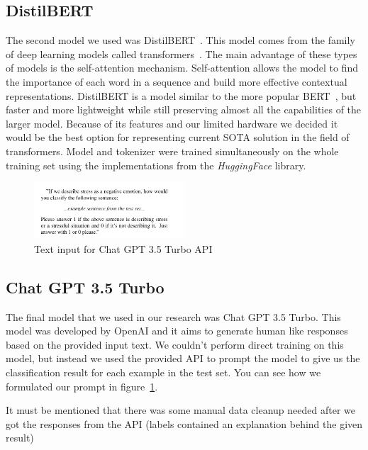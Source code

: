 \documentclass[10pt, a4paper]{article}
\begin{document}
\subsection{DistilBERT}
The second model we used was DistilBERT~\citep{sanh2020distilbert}.
This model comes from the family of deep learning models called transformers~\citep{vaswani2017attention}.
The main advantage of these types of models is the self-attention mechanism.
Self-attention allows the model to find the importance of each word in a sequence and build more effective contextual representations.
\hfill \break
\hfill \break
DistilBERT is a model similar to the more popular BERT~\citep{devlin2019bert}, but faster and more lightweight while still preserving almost all the capabilities of the larger model.
Because of its features and our limited hardware we decided it would be the best option for representing current SOTA solution in the field of transformers.
Model and tokenizer were trained simultaneously on the whole training set using the implementations from the \textit{HuggingFace} library.



\begin{figure}
    \centering
    \includegraphics[width=0.5\textwidth]{images/chat-gpt-prompt}
    \caption{Text input for Chat GPT 3.5 Turbo API}
    \label{fig:chat-gpt-prompt}
\end{figure}


\subsection{Chat GPT 3.5 Turbo}
The final model that we used in our research was Chat GPT 3.5 Turbo.
This model was developed by OpenAI and it aims to generate human like responses based on the provided input text.
We couldn't perform direct training on this model, but instead we used the provided API to prompt the model to give us the classification result for each example in the test set.
You can see how we formulated our prompt in figure~\ref{fig:chat-gpt-prompt}.

It must be mentioned that there was some manual data cleanup needed after we got the responses from the API (labels contained an explanation behind the given result)
\end{document}
